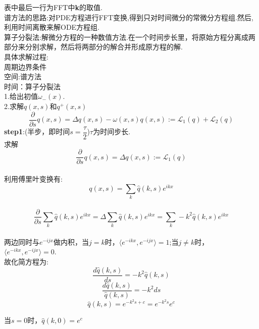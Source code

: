 \documentclass[12pt]{article}
\begin{document}
\begin{CJK}{UTF8}{gkai}
表中最后一行为FFT中\textbf{k}的取值.\\
	 

    谱方法的思路:对PDE方程进行FFT变换,得到只对时间微分的常微分方程组.然后,利用时间离散来解ODE方程组.\\
    
    算子分裂法:解微分方程的一种数值方法.在一个时间步长里，将原始方程分离成两部分来分别求解，然后将两部分的解合并形成原方程的解.\\
    
    具体求解过程:\\
    
    周期边界条件\\
   
    空间:谱方法\\
  
    时间：算子分裂法 \\
    
    1.给出初值$\omega_-(x)$.\\
    
    2.求解$q(x,s)$和$q^+(x,s)$\\
     \begin{equation}
    \frac{\partial}{\partial s}q(x,s)=\Delta q(x,s)-\omega(x,s)q(x,s)  :=\mathcal{L}_1(q)+ \mathcal{L}_2(q) 
    \end{equation}
    \textbf{step1}:(半步，即时间$s=\dfrac{\tau}{2}$)$\tau$为时间步长.\\
    
    求解$$\frac{\partial}{\partial s}q(x,s)=\Delta q(x,s):=\mathcal{L}_1(q)$$\\
    
    
     利用傅里叶变换有: $$q(x,s)= \sum_{k} \hat{q}(k,s)e^{ikx}$$\\
     
     $$\frac{\partial}{\partial s} \sum_{k}\hat{q}(k,s)e^{ikx} =\Delta\sum_{k}\hat{q} (k,s)e^{ikx}=\sum_{k}-k^2\hat{q}(k,s)e^{ikx}$$\\
     
     两边同时与$e^{-ijx}$做内积，当$j=k$时，$\langle e^{-ikx},e^{-ijx}\rangle=1$;当$j \neq k$时，$\langle e^{-ikx},e^{-ijx}\rangle=0.$\\
     
     故化简方程为:\\
     $$\frac{d\hat{q}(k,s)}{ds} = -k^2\hat{q}(k,s)$$
     $$ \frac{d\hat{q}(k,s)}{\hat{q}(k,s)} = -k^2ds $$
     $$\hat{q}(k,s)=e^{-k^2s+c}=e^{-k^2s}e^{c} $$
     
     当$s=0$时，$\hat{q}(k,0)= e^{c} $\\
     

\end{CJK}
\end{document}
